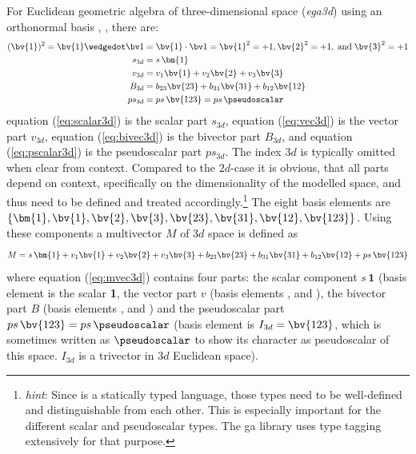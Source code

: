 For Euclidean geometric algebra of three-dimensional space (\emph{ega3d}) using an
orthonormal basis , ,  there are:
\begin{subequations}
    \begin{align}
        (\bv{1})^2 = \bv{1} \wedgedot \bv1 & = \bv{1} \cdot \bv1 = \bv{1}^2 = +1,
        \bv{2}^2 = +1, \;\text{and}\; \bv{3}^2 = +1 \nonumber\\ 
        s_{3d} & = s \, \bm{1}
        \label{eq:scalar3d} \\
        v_{3d} & = v_1\bv{1} + v_2\bv{2} + v_3\bv{3} 
        \label{eq:vec3d} \\ 
        B_{3d} & = b_{23}\bv{23} + b_{31}\bv{31} + b_{12}\bv{12} 
        \label{eq:bivec3d} \\ 
        ps_{3d} & = ps \, \bv{123}  = ps \, \pseudoscalar
        \label{eq:pscalar3d}
    \end{align}
\end{subequations}
equation (\ref{eq:scalar3d}) is the scalar part $s_{3d}$, equation (\ref{eq:vec3d}) is the
vector part $v_{3d}$, equation (\ref{eq:bivec3d}) is the bivector part $B_{3d}$, and
equation (\ref{eq:pscalar3d}) is the pseudoscalar part $ps_{3d}$. The index $3d$ is
typically omitted when clear from context. Compared to the $2d$-case it is obvious, that
all parts depend on context, specifically on the dimensionality of the modelled space, and
thus need to be defined and treated accordingly.\footnote{\emph{hint}: Since \Cpp is a
statically typed language, those types need to be well-defined and distinguishable from
each other. This is especially important for the different scalar and pseudoscalar types.
The ga library uses type tagging extensively for that purpose.} The eight basis elements
are $\{\bm{1}, \bv{1}, \bv{2}, \bv{3}, \bv{23}, \bv{31}, \bv{12}, \bv{123}\}$. Using these
components a multivector $M$ of $3d$ space is defined as
\begin{equation}
    M = s \, \bm{1} + v_1\bv{1} + v_2\bv{2} + v_3\bv{3} 
    + b_{23}\bv{23} + b_{31}\bv{31} + b_{12}\bv{12} + ps \, \bv{123}
    \label{eq:mvec3d}  
\end{equation}
where equation (\ref{eq:mvec3d}) contains four parts: the scalar component $s \, \bm{1}$
(basis element is the scalar \textbf{1}, the vector part $v$ (basis elements ,
 and ), the bivector part $B$ (basis elements ,  and )
and the pseudoscalar part $ps \, \bv{123} = ps \, \pseudoscalar$ (basis element is $I_{3d}
= \bv{123}$, which is sometimes written as $\pseudoscalar$ to show its character as
pseudoscalar of this space. $I_{3d}$ is a trivector in $3d$ Euclidean space). \\

